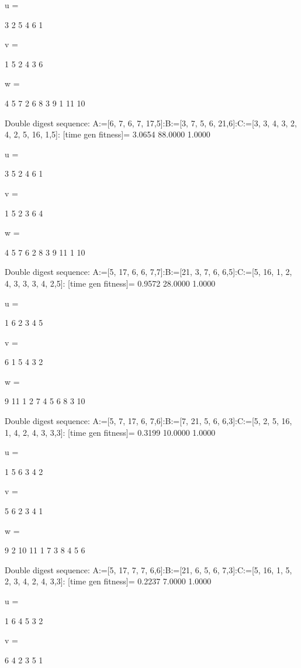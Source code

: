 u =

     3     2     5     4     6     1


v =

     1     5     2     4     3     6


w =

     4     5     7     2     6     8     3     9     1    11    10

Double digest sequence:
A:=[6, 7, 6, 7, 17,5]:B:=[3, 7, 5, 6, 21,6]:C:=[3, 3, 4, 3, 2, 4, 2, 5, 16, 1,5]:
[time gen fitness]=
    3.0654   88.0000    1.0000


u =

     3     5     2     4     6     1


v =

     1     5     2     3     6     4


w =

     4     5     7     6     2     8     3     9    11     1    10

Double digest sequence:
A:=[5, 17, 6, 6, 7,7]:B:=[21, 3, 7, 6, 6,5]:C:=[5, 16, 1, 2, 4, 3, 3, 3, 4, 2,5]:
[time gen fitness]=
    0.9572   28.0000    1.0000


u =

     1     6     2     3     4     5


v =

     6     1     5     4     3     2


w =

     9    11     1     2     7     4     5     6     8     3    10

Double digest sequence:
A:=[5, 7, 17, 6, 7,6]:B:=[7, 21, 5, 6, 6,3]:C:=[5, 2, 5, 16, 1, 4, 2, 4, 3, 3,3]:
[time gen fitness]=
    0.3199   10.0000    1.0000


u =

     1     5     6     3     4     2


v =

     5     6     2     3     4     1


w =

     9     2    10    11     1     7     3     8     4     5     6

Double digest sequence:
A:=[5, 17, 7, 7, 6,6]:B:=[21, 6, 5, 6, 7,3]:C:=[5, 16, 1, 5, 2, 3, 4, 2, 4, 3,3]:
[time gen fitness]=
    0.2237    7.0000    1.0000


u =

     1     6     4     5     3     2


v =

     6     4     2     3     5     1


